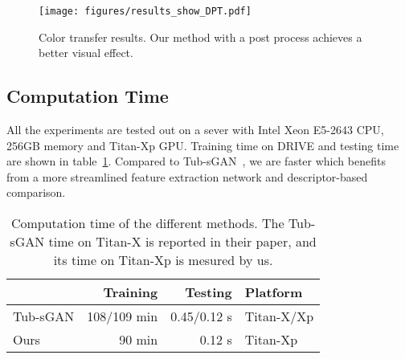 \documentclass[letterpaper]{article} %
\begin{document}




	\begin{figure}[h!]
		\begin{center}
			\texttt{[image: figures/results\_show\_DPT.pdf]}
		\end{center}
		\caption{Color transfer results. Our method with a post process achieves a better visual effect. }
		\label{fig:results_show_DPT}
	\end{figure}

	\subsection{Computation Time}

	All the experiments are tested out on a sever with Intel Xeon E5-2643 CPU, 256GB memory and Titan-Xp GPU. Training time on DRIVE and testing time are shown in table~\ref{tab:computation_time}. Compared to Tub-sGAN~\cite{zhao2018synthesizing}, we are faster which benefits from a more streamlined feature extraction network and descriptor-based comparison.

	\begin{table}[h!]
		\begin{center}
		\begin{tabularx}{\columnwidth}{XrrX}
			\hline
			 & Training & Testing & Platform \\ \hline
			Tub-sGAN & 108/109 min & 0.45/0.12 s & Titan-X/Xp \\
			Ours & 90 min & 0.12 s & Titan-Xp \\ \hline
		\end{tabularx}
		\end{center}
		\caption{Computation time of the different methods. The Tub-sGAN time on Titan-X is reported in their paper, and its time on Titan-Xp is mesured by us.}
		\label{tab:computation_time}
	\end{table}
\end{document}
